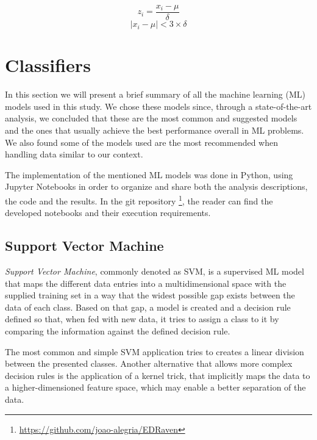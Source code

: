 \documentclass[extendedabs]{recpad2k}
\begin{document}
\vspace{-5pt}
\begin{equation}\label{zscore}
   z_{i} = \frac{x_{i} - \mu}{\delta}
\end{equation}
\vspace{-10pt}
\begin{equation}\label{outliers}
   |x_{i}-\mu| < 3\times\delta
\end{equation}
\vspace{-10pt}

\section{Classifiers}\label{classifiers} %

In this section we will present a brief summary of all the machine learning (ML) models used in this study. 
We chose these models since, through a state-of-the-art analysis, we concluded that these are the most common and suggested models and the ones that 
usually achieve the best performance overall in ML problems. 
We also found some of the models used are the most recommended when handling data similar to our context.

The implementation of the mentioned ML models was done in Python, using Jupyter Notebooks in order to organize and share both the analysis descriptions, 
the code and the results.
In the git repository \footnote{\url{https://github.com/joao-alegria/EDRaven}}, the reader can find the developed notebooks and their execution requirements.

\subsection{Support Vector Machine} 

\textit{Support Vector Machine}, commonly denoted as SVM, is a supervised ML model that maps the different data entries into a multidimensional 
space with the supplied training set in a way that the widest possible gap exists between the data of each class. 
Based on that gap, a model is created and a decision rule defined so that, when fed with new data, it tries to assign a class to it by comparing the information 
against the defined decision rule.

The most common and simple SVM application tries to creates a linear division between the presented classes. Another alternative that allows more complex 
decision rules is the application of a kernel trick, that implicitly maps the data to a higher-dimensioned feature space, which may enable a better separation 
of the data.
\end{document}
